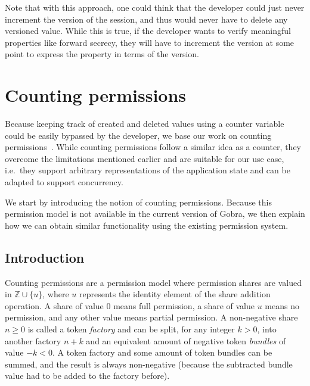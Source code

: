 Note that with this approach, one could think that the developer could just never increment the version of the session, and thus would never have to delete any versioned value. While this is true, if the developer wants to verify meaningful properties like forward secrecy, they will have to increment the version at some point to express the property in terms of the version.

\section{Counting permissions}
\label{sec:counting-permissions}

Because keeping track of created and deleted values using a counter variable could be easily bypassed by the developer, we base our work on counting permissions~\cite{roshardt2021extending}.
While counting permissions follow a similar idea as a counter, they overcome the limitations mentioned earlier and are suitable for our use case, i.e.\ they support arbitrary representations of the application state and can be adapted to support concurrency.

We start by introducing the notion of counting permissions.
Because this permission model is not available in the current version of Gobra, we then explain how we can obtain similar functionality using the existing permission system.

\subsection{Introduction}
\label{sec:counting-permissions-introduction}

Counting permissions are a permission model where permission shares are valued in $\mathbb{Z}\cup\{u\}$, where $u$ represents the identity element of the share addition operation. A share of value $0$ means full permission, a share of value $u$ means no permission, and any other value means partial permission. A non-negative share $n\geq0$ is called a token \emph{factory} and can be split, for any integer $k>0$, into another factory $n+k$ and an equivalent amount of negative token \emph{bundles} of value $-k<0$. A token factory and some amount of token bundles can be summed, and the result is always non-negative (because the subtracted bundle value had to be added to the factory before). 

